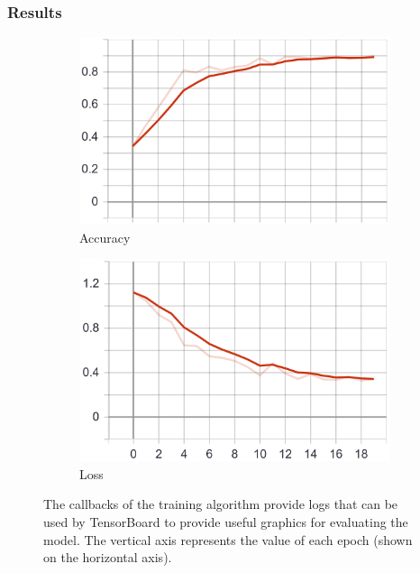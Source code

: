 \subsubsection{Results}
\begin{figure}
    \centering
    \begin{subfigure}[b]{0.4\textwidth}
        \includegraphics[width=\textwidth]{images/first_model_acc.png}
        \caption{Accuracy}
        \label{fig:first_model_acc}
    \end{subfigure}
    \begin{subfigure}[b]{0.4\textwidth}
        \includegraphics[width=\textwidth]{images/first_model_loss.png}
        \caption{Loss}
        \label{fig:first_model_loss}
    \end{subfigure}
    \caption[First model training]{The callbacks of the training algorithm provide logs that can be used by TensorBoard to provide useful graphics for evaluating the model. The vertical axis represents the value of each epoch (shown on the horizontal axis).}
    \label{fig:first_model_graphs}
\end{figure}

